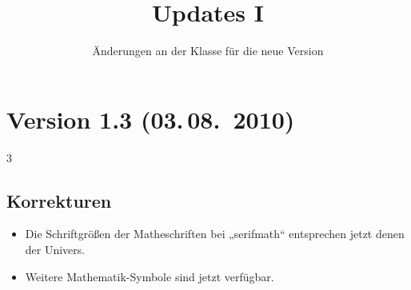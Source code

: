 \documentclass[a0paper,noDIN,MathematikA0]{tudmathposter}
\begin{document}
\vfill
\clearpage
\fax{}%
\title{Updates I}%
\subtitle{Änderungen an der Klasse für die neue Version}
\maketitle
\section{Version 1.3 (03.\,08.~2010)}
\begin{multicols}3
\subsection{Korrekturen}
\begin{itemize}
\item Die Schriftgrößen der Matheschriften bei „serifmath“ entsprechen jetzt denen der Univers.
\item Weitere Mathematik-Symbole sind jetzt verfügbar.
\end{itemize}


\end{multicols}
\end{document}
